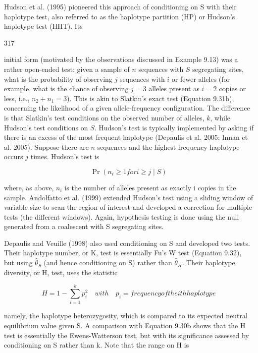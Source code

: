 \documentclass{article}
\begin{document}
Hudson et al. (1995) pioneered this approach of conditioning on S with their haplotype test, also referred to as the haplotype partition (HP) or Hudson's haplotype test (HHT). Its

317

initial form (motivated by the observations discussed in Example 9.13) was a rather open-ended test: given a sample of $n$ sequences with $S$ segregating sites, what is the probability of observing $j$ sequences with $i$ or fewer alleles (for example, what is the chance of observing $j = 3$ alleles present as $i = 2$ copies or less, i.e., $n_{2} + n_{1} = 3$). This is akin to Slatkin's exact test (Equation 9.31b), concerning the likelihood of a given allele-frequency configuration. The difference is that Slatkin's test conditions on the observed number of alleles, $k$, while Hudson's test conditions on $S$. Hudson's test is typically implemented by asking if there is an excess of the most frequent haplotype (Depaulis et al. 2005; Innan et al. 2005). Suppose there are $n$ sequences and the highest-frequency haplotype occurs $j$ times. Hudson's test is

\begin{equation}
\Pr(n_{i}\geq1 for i\geq j\mid S)
\end{equation}

where, as above,  $ n_{i} $ is the number of alleles present as exactly i copies in the sample. Andolfatto et al. (1999) extended Hudson's test using a sliding window of variable size to scan the region of interest and developed a correction for multiple tests (the different windows). Again, hypothesis testing is done using the null generated from a coalescent with S segregating sites.

Depaulis and Veuille (1998) also used conditioning on S and developed two tests. Their haplotype number, or K, test is essentially Fu's W test (Equation 9.32), but using  $ \widehat{\theta}_{S} $ (and hence conditioning on S) rather than  $ \widehat{\theta}_{H} $. Their haplotype diversity, or H, test, uses the statistic

\begin{equation}
H=1-\sum_{i=1}^{k}p_{i}^{2}\quad with\quad p_{i}=frequency of the ith haplotype
\tag{9.34a}
\label{eq:9_34a}
\end{equation}

namely, the haplotype heterozygosity, which is compared to its expected neutral equilibrium value given S. A comparison with Equation 9.30b shows that the H test is essentially the Ewens-Watterson test, but with its significance assessed by conditioning on S rather than k. Note that the range on H is
\end{document}

